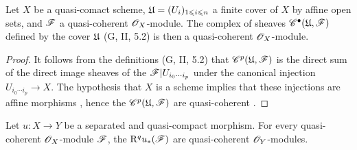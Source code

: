 \begin{lem}[1.4.9]
\label{3.1.4.9}
Let $X$ be a quasi-comact scheme, $\mathfrak{U}=(U_i)_{1\leqslant i\leqslant n}$ a finite cover of $X$ by affine open sets, and $\mathscr{F}$ a quasi-coherent $\mathscr{O}_X$-module.
The complex of sheaves $\mathscr{C}^\bullet(\mathfrak{U},\mathscr{F})$ defined by the cover $\mathfrak{U}$ (G, II, 5.2) is then a quasi-coherent $\mathscr{O}_X$-module.
\end{lem}

\begin{proof}
\label{proof-3.1.4.9}
It follows from the definitions (G, II, 5.2) that $\mathscr{C}^p(\mathfrak{U},\mathscr{F})$ is the direct sum of the direct image sheaves of the $\mathscr{F}|U_{i_0\cdots i_p}$ under the canonical injection $U_{i_0\cdots i_p}\to X$.
The hypothesis that $X$ is a scheme implies that these injections are affine morphisms , hence the $\mathscr{C}^p(\mathfrak{U},\mathscr{F})$ are quasi-coherent .
\end{proof}

\begin{prop}[1.4.10]
\label{3.1.4.10}
Let $u:X\to Y$ be a separated and quasi-compact morphism.
For every quasi-coherent $\mathscr{O}_X$-module $\mathscr{F}$, the $\mathrm{R}^q u_*(\mathscr{F})$ are quasi-coherent $\mathscr{O}_Y$-modules.
\end{prop}

